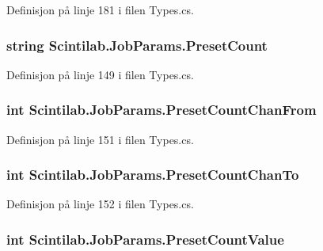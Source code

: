 Definisjon på linje 181 i filen Types.\+cs.

\hypertarget{class_scintilab_1_1_job_params_a5daf75b38346ac3efc72552761d5a8ae}{
\subsubsection[{Preset\+Count}]{\setlength{\rightskip}{0pt plus 5cm}string Scintilab.\+Job\+Params.\+Preset\+Count}}\label{class_scintilab_1_1_job_params_a5daf75b38346ac3efc72552761d5a8ae}


Definisjon på linje 149 i filen Types.\+cs.

\hypertarget{class_scintilab_1_1_job_params_af68fe1c3af440c7ae3f446b9467c242a}{
\subsubsection[{Preset\+Count\+Chan\+From}]{\setlength{\rightskip}{0pt plus 5cm}int Scintilab.\+Job\+Params.\+Preset\+Count\+Chan\+From}}\label{class_scintilab_1_1_job_params_af68fe1c3af440c7ae3f446b9467c242a}


Definisjon på linje 151 i filen Types.\+cs.

\hypertarget{class_scintilab_1_1_job_params_a40e7cd069e21f40471dd0279b201356f}{
\subsubsection[{Preset\+Count\+Chan\+To}]{\setlength{\rightskip}{0pt plus 5cm}int Scintilab.\+Job\+Params.\+Preset\+Count\+Chan\+To}}\label{class_scintilab_1_1_job_params_a40e7cd069e21f40471dd0279b201356f}


Definisjon på linje 152 i filen Types.\+cs.

\hypertarget{class_scintilab_1_1_job_params_a0947716fc8b02cac5ec231ab24033058}{
\subsubsection[{Preset\+Count\+Value}]{\setlength{\rightskip}{0pt plus 5cm}int Scintilab.\+Job\+Params.\+Preset\+Count\+Value}}\label{class_scintilab_1_1_job_params_a0947716fc8b02cac5ec231ab24033058}


